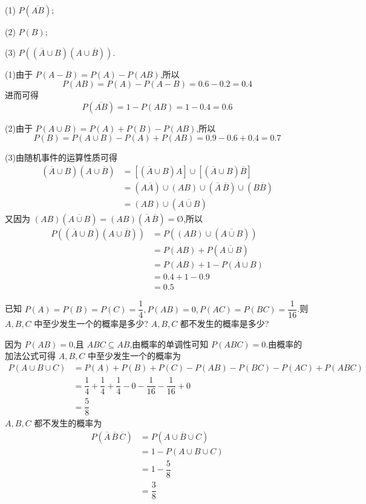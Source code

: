 (1) $P(\overline{AB})$;

(2) $P(B)$;

(3) $P((\overline{A} \cup B)(A \cup \overline{B}))$.

\begin{solution}
    (1)由于 $P(A-B) = P(A) - P(AB)$,所以
    $$
    P(AB) = P(A) - P(A-B) = 0.6 - 0.2 = 0.4
    $$
    进而可得
    $$
    P(\overline{AB}) = 1 - P(AB) = 1 - 0.4 = 0.6
    $$

    (2)由于 $P(A \cup B) = P(A) + P(B) - P(AB)$,所以
    $$
    P(B) = P(A \cup B) - P(A) + P(AB) = 0.9 - 0.6 + 0.4 = 0.7
    $$

    (3)由随机事件的运算性质可得
    $$
    \begin{aligned}
        (\overline{A} \cup B)(A \cup \overline{B}) &= [(\overline{A} \cup B) A] \cup [(\overline{A} \cup B) \overline{B}] \\
        &= (A \overline{A}) \cup (AB) \cup (\overline{A} \, \overline{B}) \cup (B \overline{B}) \\
        &= (AB) \cup (\overline{A \cup B})
    \end{aligned}
    $$
    又因为 $(AB)(\overline{A \cup B}) = (AB)(\overline{A} \, \overline{B}) = \text{\O}$,所以
    $$
    \begin{aligned}
        P((\overline{A} \cup B)(A \cup \overline{B})) &= P((AB) \cup (\overline{A \cup B})) \\
        &= P(AB) + P(\overline{A \cup B}) \\
        &= P(AB) + 1 - P(A \cup B) \\
        &= 0.4 + 1 - 0.9 \\
        &= 0.5
    \end{aligned}
    $$
\end{solution}

\question 已知 $P(A) = P(B) = P(C) = \dfrac{1}{4}, P(AB) = 0, P(AC) = P(BC) = \dfrac{1}{16}$.则 $A,B,C$ 中至少发生一个的概率是多少? $A,B,C$ 都不发生的概率是多少?

\begin{solution}
    因为 $P(AB) = 0$,且 $ABC \subseteq AB$,由概率的单调性可知 $P(ABC) = 0$.由概率的加法公式可得 $A,B,C$ 中至少发生一个的概率为
    $$
    \begin{aligned}
        P(A \cup B \cup C) &= P(A) + P(B) + P(C) - P(AB) - P(BC) - P(AC) + P(ABC) \\
        &= \dfrac{1}{4} + \dfrac{1}{4} + \dfrac{1}{4} - 0 - \dfrac{1}{16} - \dfrac{1}{16} + 0 \\
        &= \dfrac{5}{8}
    \end{aligned}
    $$
    $A,B,C$ 都不发生的概率为
    $$
    \begin{aligned}
        P(\overline{A} \, \overline{B} \, \overline{C}) &= P(\overline{A \cup B \cup C}) \\
        &= 1 - P(A \cup B \cup C) \\
        &= 1 - \dfrac{5}{8} \\
        &= \dfrac{3}{8}
    \end{aligned}
    $$
\end{solution}

